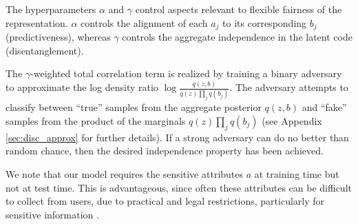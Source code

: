 The hyperparameters $\alpha$ and $\gamma$ control aspects relevant to flexible fairness of the representation. $\alpha$ controls the alignment of each $a_j$ to its corresponding $b_j$ (predictiveness), whereas $\gamma$ controls the aggregate independence in the latent code (disentanglement).

The $\gamma$-weighted total correlation term is realized by training a binary adversary  to approximate the log density ratio $\log \frac{q(z,b)}{q(z)\prod_j q(b_j)}$.
The adversary attempts to classify between ``true'' samples from the aggregate posterior $q(z,b)$ and ``fake'' samples from the product of the marginals $q(z)\prod_j q(b_j)$ (see Appendix \ref{sec:disc_approx} for further details).
If a strong adversary can do no better than random chance, then the desired independence property has been achieved.

We note that our model requires the sensitive attributes $a$ at training time but not at test time.
This is advantageous, since often these attributes can be difficult to collect from users, due to practical and legal restrictions, particularly for sensitive information \citep{elliot2008new,division1983}.
